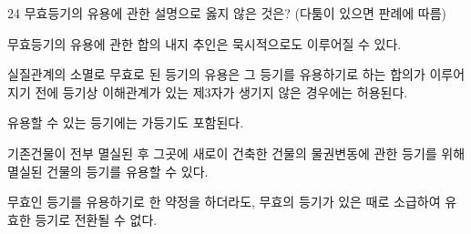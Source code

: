 \begin{question}{24}
무효등기의 유용에 관한 설명으로 옳지 않은 것은? (다툼이 있으면 판례에 따름)
\begin{choices}
  \item 무효등기의 유용에 관한 합의 내지 추인은 묵시적으로도 이루어질 수 있다.
  \item 실질관계의 소멸로 무효로 된 등기의 유용은 그 등기를 유용하기로 하는 합의가 이루어지기 전에 등기상 이해관계가 있는 제3자가 생기지 않은 경우에는 허용된다.
  \item 유용할 수 있는 등기에는 가등기도 포함된다.
  \item 기존건물이 전부 멸실된 후 그곳에 새로이 건축한 건물의 물권변동에 관한 등기를 위해 멸실된 건물의 등기를 유용할 수 있다.
  \item 무효인 등기를 유용하기로 한 약정을 하더라도, 무효의 등기가 있은 때로 소급하여 유효한 등기로 전환될 수 없다.
\end{choices}
\end{question}
